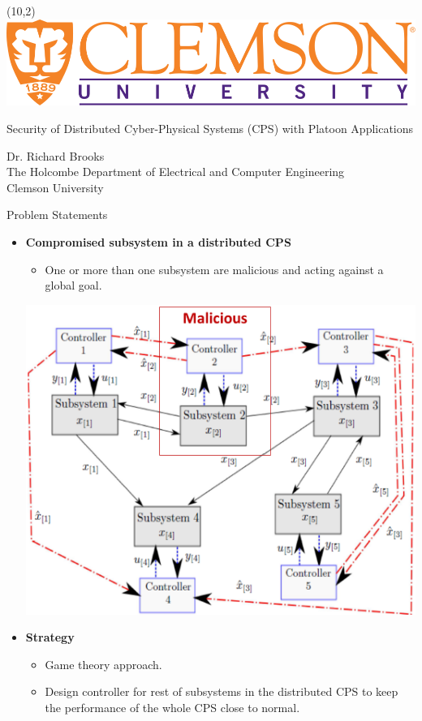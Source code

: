 \documentclass[12pt]{beamer}
\begin{document}
\begin{frame}
\begin{textblock}{20}(10,2)
\includegraphics[scale=.1]{media/logo.png}
\end{textblock}

\vspace{1in}
\huge Security of Distributed Cyber-Physical Systems (CPS) with Platoon Applications\\
\normalsize
\vspace{.25in}
\begin{center}
\large 
Dr. Richard Brooks \\
The Holcombe Department of Electrical and Computer Engineering\\
Clemson University
\end{center}
\end{frame}

\begin{frame}{Problem Statements}
\begin{itemize}
\item \textbf{Compromised subsystem in a distributed CPS}
\begin{itemize}
\item One or more than one subsystem are malicious and acting against a global goal.
\end{itemize}
\hfill \includegraphics[scale=.1]{media/compromised.eps} \vspace{-.3in}
\item \textbf{Strategy}
\begin{itemize}
\item Game theory approach.
\item Design controller for rest of subsystems in the distributed CPS to keep the performance of the whole CPS close to normal.
\end{itemize}
\end{itemize}
\end{frame}
\end{document}
